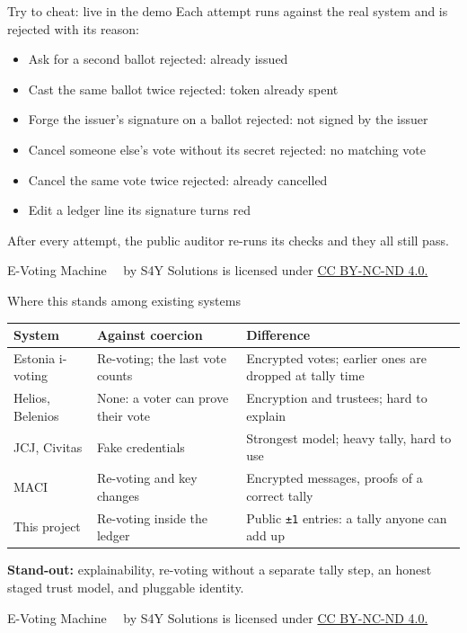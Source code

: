 \documentclass[11pt,aspectratio=169]{beamer}
\newcommand{\currentyear}{\the\year}
\newcommand{\copyrightnote}{
    \vfill
    \begin{flushleft}
    \tiny
    E-Voting Machine \textcopyright~\currentyear~by S4Y Solutions is licensed under
    \href{https://creativecommons.org/licenses/by-nc-nd/4.0}{CC BY-NC-ND 4.0.}
    \end{flushleft}
}
\begin{document}
\begin{frame}{Try to cheat: live in the demo}
    Each attempt runs against the real system and is rejected with its reason:
    \begin{itemize}
        \item Ask for a second ballot \hfill \textcolor{ok}{rejected: already issued}
        \item Cast the same ballot twice \hfill \textcolor{ok}{rejected: token already spent}
        \item Forge the issuer's signature on a ballot \hfill \textcolor{ok}{rejected: not signed by the issuer}
        \item Cancel someone else's vote without its secret \hfill \textcolor{ok}{rejected: no matching vote}
        \item Cancel the same vote twice \hfill \textcolor{ok}{rejected: already cancelled}
        \item Edit a ledger line \hfill \textcolor{ok}{its signature turns red}
    \end{itemize}
    \medskip
    After every attempt, the public auditor re-runs its checks and they all still pass.
    \copyrightnote
\end{frame}

\begin{frame}{Where this stands among existing systems}
    \footnotesize
    \renewcommand{\arraystretch}{1.2}
    \begin{tabular}{B{0.15\textwidth}L{0.37\textwidth}L{0.38\textwidth}}
        \toprule
        System & Against coercion & Difference \\
        \midrule
        Estonia i-voting & Re-voting; the last vote counts & Encrypted votes; earlier ones are dropped at tally time \\
        Helios, Belenios & None: a voter can prove their vote & Encryption and trustees; hard to explain \\
        JCJ, Civitas & Fake credentials & Strongest model; heavy tally, hard to use \\
        MACI & Re-voting and key changes & Encrypted messages, proofs of a correct tally \\
        \textcolor{main}{This project} & \textcolor{main}{Re-voting inside the ledger} & \textcolor{main}{Public \texttt{±1} entries: a tally anyone can add up} \\
        \bottomrule
    \end{tabular}

    \medskip
    \small
    \textbf{Stand-out:} explainability, re-voting without a separate tally step, an honest staged trust
    model, and pluggable identity.
    \copyrightnote
\end{frame}
\end{document}
